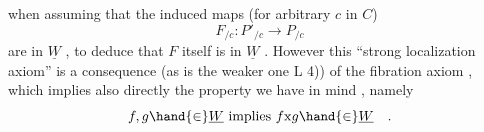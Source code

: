 when assuming that the induced maps (for arbitrary $c$ in $C$)
\[ F_{/c} : P'_{/c}\to P_{/c} \]
are in $\underline{W}$ , to deduce that $F$ itself is in $\underline{W}$ . However this ``strong
localization axiom'' is a consequence (as is the weaker one L 4)) of
\margin{$\times$} the fibration axiom , which implies also directly the property we have
in mind , namely 
\[ f,g \hand{\in} \underline{W} \text{ implies } f\mathrm{x}g \hand{\in} \underline{W} \quad . \]

